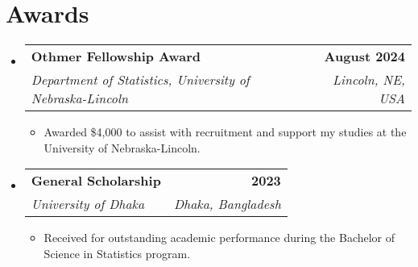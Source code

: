\documentclass[letterpaper,11pt]{article}
\makeatletter
\newcommand{\resumeItem}[1]{
  \item\small{
    {#1 \vspace{-2pt}}
  }
}
\newcommand{\resumeSubheading}[4]{
  \vspace{-2pt}\item
    \begin{tabular*}{1.0\textwidth}[t]{l@{\extracolsep{\fill}}r}
      \textbf{#1} & \textbf{\small #2} \\
      \textit{\small#3} & \textit{\small #4} \\
    \end{tabular*}\vspace{-7pt}
}
\newcommand{\resumeSubHeadingListStart}{\begin{itemize}[leftmargin=0.0in, label={}]}
\newcommand{\resumeSubHeadingListEnd}{\end{itemize}}
\newcommand{\resumeItemListStart}{\begin{itemize}}
\newcommand{\resumeItemListEnd}{\end{itemize}\vspace{-5pt}}
\makeatother
\begin{document}
\section{Awards}
  \resumeSubHeadingListStart
    \resumeSubheading
      {Othmer Fellowship Award}{August 2024}
      {Department of Statistics, University of Nebraska-Lincoln}{Lincoln, NE, USA}
        \resumeItemListStart
        \resumeItem{Awarded \$4,000 to assist with recruitment and support my studies at the University of Nebraska-Lincoln.}
      \resumeItemListEnd
      \resumeSubheading
      {General Scholarship}{2023}
      {University of Dhaka}{Dhaka, Bangladesh}
      \resumeItemListStart
        \resumeItem{Received for outstanding academic performance during the Bachelor of Science in Statistics program.}
      \resumeItemListEnd
  \resumeSubHeadingListEnd
\end{document}
